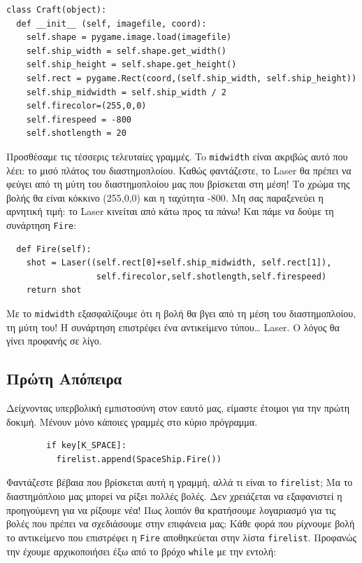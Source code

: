 \begin{verbatim}
class Craft(object):
  def __init__ (self, imagefile, coord):
    self.shape = pygame.image.load(imagefile)
    self.ship_width = self.shape.get_width()
    self.ship_height = self.shape.get_height()
    self.rect = pygame.Rect(coord,(self.ship_width, self.ship_height))
    self.ship_midwidth = self.ship_width / 2
    self.firecolor=(255,0,0)
    self.firespeed = -800
    self.shotlength = 20
\end{verbatim}

Προσθέσαμε τις τέσσερις τελευταίες γραμμές. To {\tt midwidth} είναι ακριβώς αυτό που λέει: το μισό πλάτος του διαστημοπλοίου. Καθώς φαντάζεστε, το Laser θα πρέπει να φεύγει από τη μύτη του διαστημοπλοίου μας που βρίσκεται στη μέση! Το χρώμα της βολής θα είναι κόκκινο (255,0,0) και η ταχύτητα -800. Μη σας παραξενεύει η αρνητική τιμή: το Laser κινείται από κάτω προς τα πάνω! Και πάμε να δούμε τη συνάρτηση {\tt Fire}:

\begin{verbatim}
  def Fire(self):
    shot = Laser((self.rect[0]+self.ship_midwidth, self.rect[1]), 
                  self.firecolor,self.shotlength,self.firespeed)
    return shot
\end{verbatim}

Με το {\tt midwidth} εξασφαλίζουμε ότι η βολή θα βγει από τη μέση του διαστημοπλοίου, τη μύτη του! Η συνάρτηση επιστρέφει ένα αντικείμενο τύπου\ldots{} Laser. Ο λόγος θα γίνει προφανής σε λίγο.
%
\subsection{Πρώτη Απόπειρα}
%
Δείχνοντας υπερβολική εμπιστοσύνη στον εαυτό μας, είμαστε έτοιμοι για την πρώτη δοκιμή. Μένουν μόνο κάποιες γραμμές στο κύριο πρόγραμμα.

\begin{verbatim}
        if key[K_SPACE]:
          firelist.append(SpaceShip.Fire())
\end{verbatim}

Φαντάζεστε βέβαια που βρίσκεται αυτή η γραμμή, αλλά τι είναι το {\tt firelist}; Μα το διαστημόπλοιο μας μπορεί να ρίξει πολλές βολές. Δεν χρειάζεται να εξαφανιστεί η προηγούμενη για να ρίξουμε νέα! Πως λοιπόν θα κρατήσουμε λογαριασμό για τις βολές που πρέπει να σχεδιάσουμε στην επιφάνεια μας; Κάθε φορά που ρίχνουμε βολή το αντικείμενο που επιστρέφει η {\tt Fire} αποθηκεύεται στην λίστα {\tt firelist}. Προφανώς την έχουμε αρχικοποιήσει έξω από το βρόχο {\tt while} με την εντολή:

